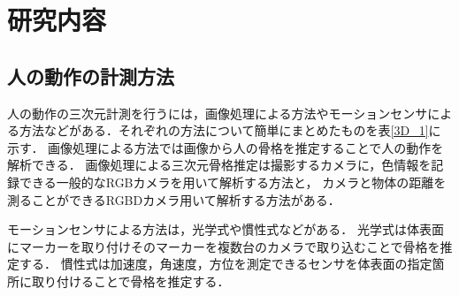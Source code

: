 \documentclass[titlepage]{jarticle}
\begin{document}
%
%
\section{研究内容}

%
%
\subsection{人の動作の計測方法}
%
人の動作の三次元計測を行うには，画像処理による方法やモーションセンサによる方法などがある．それぞれの方法について簡単にまとめたものを表\ref{3D_1}に示す．
画像処理による方法では画像から人の骨格を推定することで人の動作を解析できる．
画像処理による三次元骨格推定は撮影するカメラに，色情報を記録できる一般的なRGBカメラを用いて解析する方法と，
カメラと物体の距離を測ることができるRGBDカメラ用いて解析する方法がある．

モーションセンサによる方法は，光学式や慣性式などがある．
光学式は体表面にマーカーを取り付けそのマーカーを複数台のカメラで取り込むことで骨格を推定する．
慣性式は加速度，角速度，方位を測定できるセンサを体表面の指定箇所に取り付けることで骨格を推定する．
\end{document}
